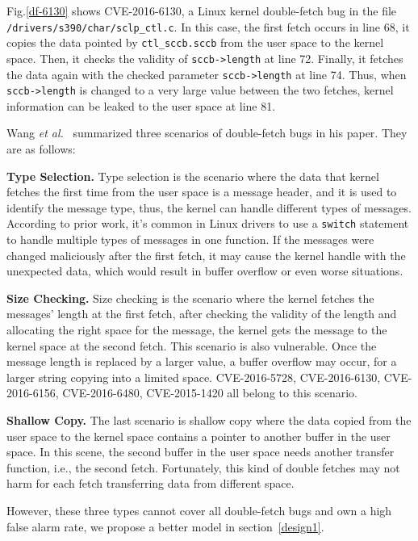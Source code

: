 \documentclass[10pt]{llncs}
\begin{document}
Fig.\ref{df-6130} shows CVE-2016-6130, a Linux kernel double-fetch bug in the file \verb:/drivers/s390/char/sclp_ctl.c:. In this case, the first fetch occurs in line 68, it copies the data pointed by \verb:ctl_sccb.sccb: from the user space to the kernel space. Then, it checks the validity of \verb:sccb->length: at line 72. Finally, it fetches the data again with the checked parameter \verb:sccb->length: at line 74. Thus, when \verb:sccb->length: is changed to a very large value between the two fetches, kernel information can be leaked to the user space at line 81.

Wang \textit{et al.}~\cite{wang} summarized three scenarios of double-fetch bugs in his paper. They are as follows:

\textbf{Type Selection.}
Type selection is the scenario where the data that kernel fetches the first time from the user space is a message header, and it is used to identify the message type, thus, the kernel can handle different types of messages. According to prior work, it's common in Linux drivers to use a \verb:switch: statement to handle multiple types of messages in one function. If the messages were changed maliciously after the first fetch, it may cause the kernel handle with the unexpected data, which would result in buffer overflow or even worse situations.

\textbf{Size Checking.}
Size checking is the scenario where the kernel fetches the messages' length at the first fetch, after checking the validity of the length and allocating the right space for the message, the kernel gets the message to the kernel space at the second fetch. This scenario is also vulnerable. Once the message length is replaced by a larger value, a buffer overflow may occur, for a larger string copying into a limited space. CVE-2016-5728, CVE-2016-6130, CVE-2016-6156, CVE-2016-6480, CVE-2015-1420 all belong to this scenario.

\textbf{Shallow Copy.}
The last scenario is shallow copy where the data copied from the user space to  the kernel space contains a pointer to another buffer in the user space. In this scene, the second buffer in the user space needs another transfer function, i.e., the second fetch. Fortunately, this kind of double fetches may not harm for each fetch transferring data from different space.

However, these three types cannot cover all double-fetch bugs and own a high false alarm rate, we propose a better model in section~\ref{design1}.
\end{document}
